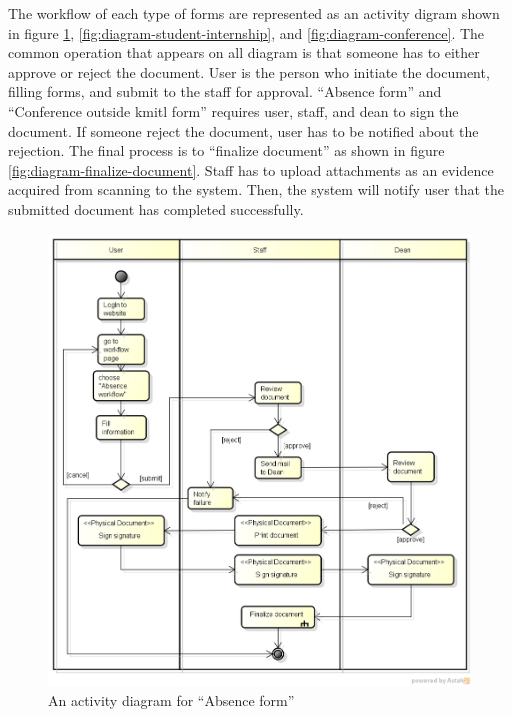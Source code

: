 The workflow of each type of forms are represented as an activity digram shown in figure \ref{fig:diagram-absence}, \ref{fig:diagram-student-internship}, and \ref{fig:diagram-conference}.
The common operation that appears on all diagram is that someone has to either approve or reject the document.
User is the person who initiate the document, filling forms, and submit to the staff for approval.
\enquote{Absence form} and \enquote{Conference outside \gls{kmitl} form} requires user, staff, and dean to sign the document.
If someone reject the document, user has to be notified about the rejection.
The final process is to \enquote{finalize document} as shown in figure \ref{fig:diagram-finalize-document}.
Staff has to upload attachments as an evidence acquired from scanning to the system. 
Then, the system will notify user that the submitted document has completed successfully.
\begin{figure}[h]
	\centering
	\caption{An activity diagram for \enquote{Absence form}}
	\label{fig:diagram-absence}
	\includegraphics[scale=0.5]{res/Methodology/absence}
\end{figure}


